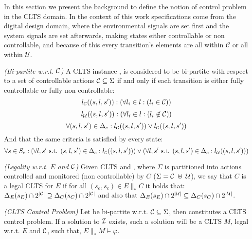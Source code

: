 In this section we present the background to define the notion of control problem in the CLTS domain.  In the context of this work specifications come from the digital design domain, where the environmental signals are set first and the system signals are set afterwards, making states either controllable or non controllable, and because of this every transition's elements are all within $\mathcal{C}$ or all within $\mathcal{U}$. 

\begin{definition}\label{def:bi-partite_clts} \emph{(Bi-partite w.r.t. ${\mathcal{C}}$)} 
A CLTS instance \cltsDef, is considered to be bi-partite with respect to a set of controllable actions ${\mathcal{C}} \subseteq \Sigma$ if and only if each transition is either fully controllable or fully non controllable:
\[ l_{{\mathcal{C}}}((s,l,s')): ( \forall l_i \in l:(l_i \in {\mathcal{C}}))\]
\[ l_{{\mathcal{U}}}((s,l,s')): ( \forall l_i \in l:(l_i \not\in {\mathcal{C}}))\]
\[ \forall (s,l,s') \in \Delta_e: l_{\mathcal{C}}((s,l,s')) \vee l_{{\mathcal{C}}}((s,l,s')) \]
And that the same criteria is satisfied by every state:
\[ \forall s \in S_e : (\forall l, s' \text{ s.t. } (s,l,s') \in \Delta_e:l_{{\mathcal{C}}}((s,l,s')))\vee (\forall l, s' \text{ s.t. } (s,l,s') \in \Delta_e:l_{{\mathcal{U}}}((s,l,s')))\]
\end{definition}

\begin{definition}
	\label{def:legal_clts} \emph{(Legality w.r.t. $E$ and ${\mathcal{C}}$)} 
	Given CLTS  and , where $\Sigma$ is partitioned into actions controlled and monitored (non controllable) by $C$ ($\Sigma={\mathcal{C}} \; \uplus \;{\mathcal{U}}$), we say that $C$ is a legal CLTS for $E$ if for all $(s_e,s_c) \in E \parallel_* C$ it holds that:
	$\Delta_{E}(s_E)\cap 2^{|{\mathcal{C}}|} \supseteq \Delta_{C}(s_C)\cap 2^{|{\mathcal{C}}|}$ and also that  $\Delta_{E}(s_E)\cap 2^{|{\mathcal{U}}|} \subseteq \Delta_{C}(s_C)\cap 2^{|{\mathcal{U}}|}$.
\end{definition}

\begin{definition}
	\label{def:clts_control_problem} \emph{(CLTS Control Problem)} 
	Let  be bi-partite w.r.t. ${\mathcal{C}} \subseteq \Sigma$, then \controlProblemDef constitutes a CLTS control problem. If a solution to ${\mathcal{I}}$ exists, such a solution will be a CLTS $M$, legal w.r.t. $E$ and ${\mathcal{C}}$, such that, $E \parallel_* M \models \varphi$.
\end{definition}
